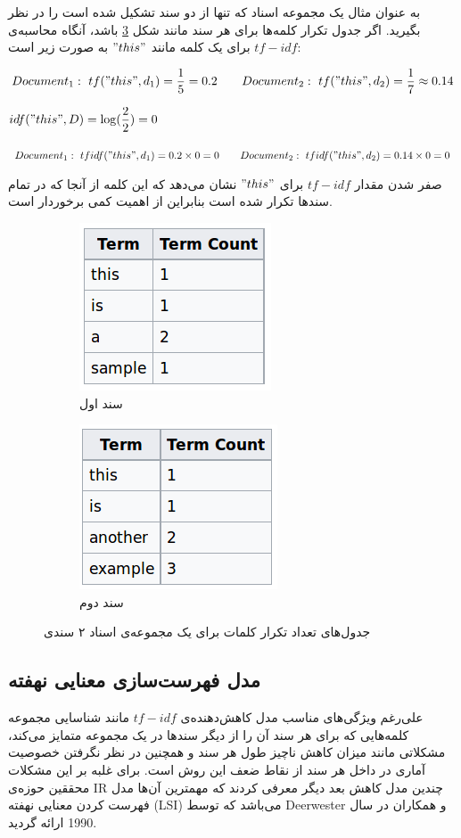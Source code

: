 	به عنوان مثال یک مجموعه اسناد که تنها از دو سند تشکیل شده است را در نظر بگیرید. اگر جدول تکرار کلمه‌ها برای هر سند مانند شکل
	\ref{chap3-fig3}
	باشد، آنگاه محاسبه‌ی
	$tf-idf$
	برای یک کلمه مانند
	$"this"$
	به صورت زیر است:
\begin{flushleft}
$Document_1:\  tf("this",d_1) = \dfrac{1}{5} = 0.2 \qquad Document_2:\  tf("this",d_2) = \dfrac{1}{7} \approx 0.14$

$idf("this",D) = \log(\dfrac{2}{2}) = 0$

$Document_1:\  tfidf("this",d_1) = 0.2 \times 0 = 0 \qquad Document_2:\  tfidf("this",d_2) = 0.14 \times 0 = 0$
\end{flushleft}
صفر شدن مقدار 
$tf-idf$ 
برای 
$"this"$ 
نشان می‌‌دهد که این کلمه از آنجا که در تمام سند‌ها تکرار شده است بنابراین از اهمیت کمی‌ برخوردار است.   
	\begin{figure}[b]
		\centering
		\begin{subfigure}{0.3\textwidth}
			\centering
			\includegraphics[scale=0.4]{chap3-img/tf-idf1}
			\caption{سند اول}
			\label{chap3-fig3-1}
		\end{subfigure}		
		\begin{subfigure}{0.3\textwidth}
			\centering
			\includegraphics[scale=0.4]{chap3-img/tf-idf2}
			\caption{سند دوم}
			\label{chap3-fig3-2}
		\end{subfigure}
		\caption{جدول‌های تعداد تکرار کلمات برای یک مجموعه‌ی اسناد ۲ سندی}
		\label{chap3-fig3}
	\end{figure}
	
	\subsection{مدل فهرست‌سازی معنایی نهفته}
	\label{chap3sec3sub2}
	علی‌رغم ویژگی‌‌های مناسب مدل کاهش‌دهنده‌ی
	$tf-idf$
	مانند شناسایی مجموعه کلمه‌هایی که برای هر سند آن را از دیگر سند‌ها در یک مجموعه متمایز می‌‌کند، مشکلاتی مانند میزان کاهش ناچیز طول هر سند و همچنین در نظر نگرفتن خصوصیت آماری‌ در داخل هر سند از نقاط ضعف این روش است. برای غلبه بر این مشکلات محققین حوزه‌ی
	IR
	چندین مدل کاهش بعد دیگر معرفی‌ کردند که مهمترین آن‌ها مدل فهرست کردن معنایی نهفته
	(LSI)
	می‌باشد که توسط
	Deerwester \cite{deerwester1990indexing}
	 و همکاران در سال 1990 ارائه گردید.
	
